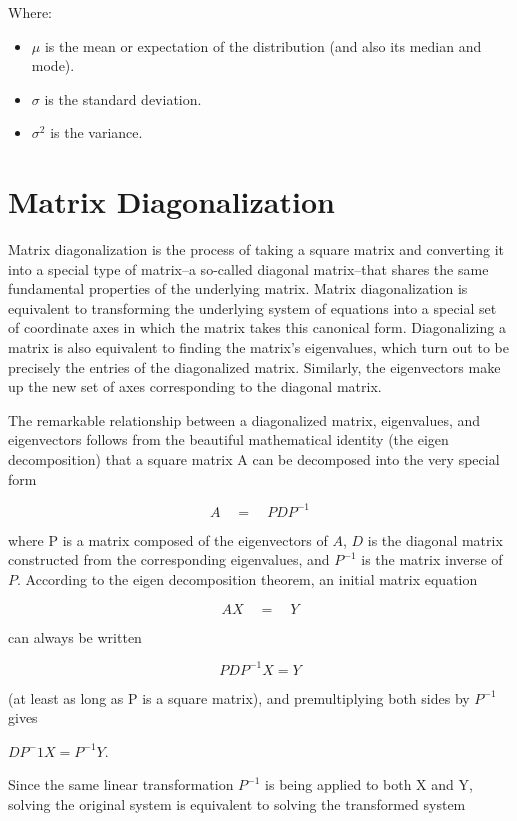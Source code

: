 \documentclass[12pt,notitlepage,oneside]{report}
\begin{document}
Where: 

\begin{itemize}
	\item $\mu$ is the mean or expectation of the distribution (and also its median and mode).
	\item $ \sigma $ is the standard deviation.
	\item $ \sigma ^2 $ is the variance.
\end{itemize}




\section{Matrix Diagonalization}

Matrix diagonalization is the process of taking a square matrix and converting it into a special type of matrix--a so-called diagonal matrix--that shares the same fundamental properties of the underlying matrix. Matrix diagonalization is equivalent to transforming the underlying system of equations into a special set of coordinate axes in which the matrix takes this canonical form. Diagonalizing a matrix is also equivalent to finding the matrix's eigenvalues, which turn out to be precisely the entries of the diagonalized matrix. Similarly, the eigenvectors make up the new set of axes corresponding to the diagonal matrix.

The remarkable relationship between a diagonalized matrix, eigenvalues, and eigenvectors follows from the beautiful mathematical identity (the eigen decomposition) that a square matrix A can be decomposed into the very special form

$$ A \quad = \quad PDP^{-1} $$

where P is a matrix composed of the eigenvectors of $A$, $D$ is the diagonal matrix constructed from the corresponding eigenvalues, and $P^{-1}$ is the matrix inverse of $P$. According to the eigen decomposition theorem, an initial matrix equation

$$ AX \quad = \quad Y $$

can always be written 

$$ PDP^{-1}X = Y $$

(at least as long as P is a square matrix), and premultiplying both sides by $P^{-1}$ gives

$DP^-1X = P^{-1}Y.$

Since the same linear transformation $P^{-1}$ is being applied to both X and Y, solving the original system is equivalent to solving the transformed system
\end{document}
